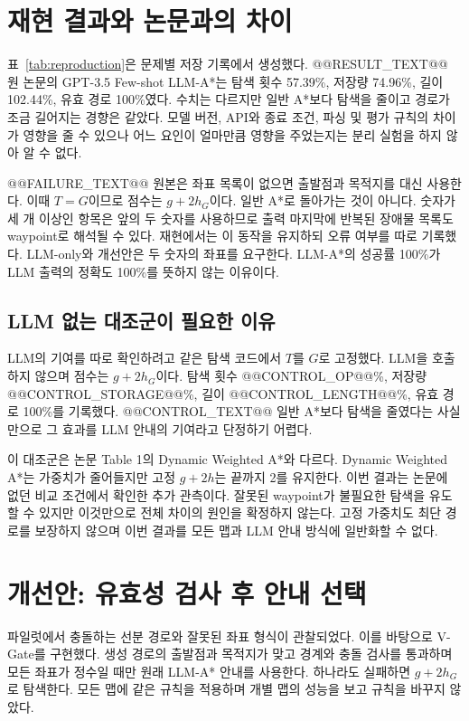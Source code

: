 \documentclass[11pt]{article}
\begin{document}
\section{재현 결과와 논문과의 차이}
표~\ref{tab:reproduction}은 문제별 저장 기록에서 생성했다. @@RESULT_TEXT@@ 원 논문의 GPT-3.5 Few-shot LLM-A*는 탐색 횟수 57.39\%, 저장량 74.96\%, 길이 102.44\%, 유효 경로 100\%였다. 수치는 다르지만 일반 A*보다 탐색을 줄이고 경로가 조금 길어지는 경향은 같았다. 모델 버전, API와 종료 조건, 파싱 및 평가 규칙의 차이가 영향을 줄 수 있으나 어느 요인이 얼마만큼 영향을 주었는지는 분리 실험을 하지 않아 알 수 없다.

@@FAILURE_TEXT@@ 원본은 좌표 목록이 없으면 출발점과 목적지를 대신 사용한다. 이때 $T=G$이므로 점수는 $g+2h_G$이다. 일반 A*로 돌아가는 것이 아니다. 숫자가 세 개 이상인 항목은 앞의 두 숫자를 사용하므로 출력 마지막에 반복된 장애물 목록도 waypoint로 해석될 수 있다. 재현에서는 이 동작을 유지하되 오류 여부를 따로 기록했다. LLM-only와 개선안은 두 숫자의 좌표를 요구한다. LLM-A*의 성공률 100\%가 LLM 출력의 정확도 100\%를 뜻하지 않는 이유이다.

\subsection{LLM 없는 대조군이 필요한 이유}
LLM의 기여를 따로 확인하려고 같은 탐색 코드에서 $T$를 $G$로 고정했다. LLM을 호출하지 않으며 점수는 $g+2h_G$이다. 탐색 횟수 @@CONTROL_OP@@\%, 저장량 @@CONTROL_STORAGE@@\%, 길이 @@CONTROL_LENGTH@@\%, 유효 경로 100\%를 기록했다. @@CONTROL_TEXT@@ 일반 A*보다 탐색을 줄였다는 사실만으로 그 효과를 LLM 안내의 기여라고 단정하기 어렵다.

이 대조군은 논문 Table 1의 Dynamic Weighted A*와 다르다. Dynamic Weighted A*는 가중치가 줄어들지만 고정 $g+2h$는 끝까지 2를 유지한다. 이번 결과는 논문에 없던 비교 조건에서 확인한 추가 관측이다. 잘못된 waypoint가 불필요한 탐색을 유도할 수 있지만 이것만으로 전체 차이의 원인을 확정하지 않는다. 고정 가중치도 최단 경로를 보장하지 않으며 이번 결과를 모든 맵과 LLM 안내 방식에 일반화할 수 없다.

\section{개선안: 유효성 검사 후 안내 선택}
파일럿에서 충돌하는 선분 경로와 잘못된 좌표 형식이 관찰되었다. 이를 바탕으로 V-Gate를 구현했다. 생성 경로의 출발점과 목적지가 맞고 경계와 충돌 검사를 통과하며 모든 좌표가 정수일 때만 원래 LLM-A* 안내를 사용한다. 하나라도 실패하면 $g+2h_G$로 탐색한다. 모든 맵에 같은 규칙을 적용하며 개별 맵의 성능을 보고 규칙을 바꾸지 않았다.
\end{document}
